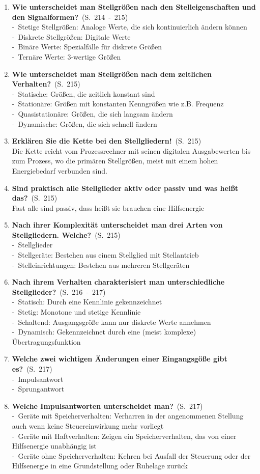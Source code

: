 \documentclass[a4paper,12pt]{article}
\newcommand{\question}[3]{\pagebreak[3]\item {\textbf{#1?}}\ (S.\ #2)#3}
\newcommand{\statement}[3]{\pagebreak[3]\item {\textbf{#1!}}\ (S.\ #2)#3}
\newcommand{\catchword}[1]{\\-\ #1}
\newcommand{\normaltext}[1]{\\#1}
\newcommand{\page}[1]{#1}
\newcommand{\pages}[2]{#1\ -\ #2}
\begin{document}
\begin{enumerate}
  \question{Wie unterscheidet man Stellgrößen nach den Stelleigenschaften
            und den Signalformen}{\pages{214}{215}}
  {
    \catchword{Stetige Stellgrößen: Analoge Werte, die sich kontinuierlich ändern können}
    \catchword{Diskrete Stellgrößen: Digitale Werte}
    \catchword{Binäre Werte: Spezialfälle für diskrete Größen}
    \catchword{Ternäre Werte: 3-wertige Größen}
  }

  \question{Wie unterscheidet man Stellgrößen nach dem zeitlichen Verhalten}{\page{215}}
  {
    \catchword{Statische: Größen, die zeitlich konstant sind}
    \catchword{Stationäre: Größen mit konstanten Kenngrößen wie z.B. Frequenz}
    \catchword{Quasistationäre: Größen, die sich langsam ändern}
    \catchword{Dynamische: Größen, die sich schnell ändern}
  }

  \statement{Erklären Sie die Kette bei den Stellgliedern}{\page{215}}
  {
    \normaltext{Die Kette reicht vom Prozessrechner mit seinen digitalen Ausgabewerten
                bis zum Prozess, wo die primären Stellgrößen, meist mit einem hohen
                Energiebedarf verbunden sind.}
  }

  \question{Sind praktisch alle Stellglieder aktiv oder passiv und was heißt das}{\page{215}}
  {
    \normaltext{Fast alle sind passiv, dass heißt sie brauchen eine Hilfsenergie}
  }

  \question{Nach ihrer Komplexität unterscheidet man drei Arten von Stellgliedern. Welche}{\page{215}}
  {
    \catchword{Stellglieder}
    \catchword{Stellgeräte: Bestehen aus einem Stellglied mit Stellantrieb}
    \catchword{Stelleinrichtungen: Bestehen aus mehreren Stellgeräten}
  }

  \question{Nach ihrem Verhalten charakterisiert man unterschiedliche Stellglieder}{\pages{216}{217}}
  {
    \catchword{Statisch: Durch eine Kennlinie gekennzeichnet}
    \catchword{Stetig: Monotone und stetige Kennlinie}
    \catchword{Schaltend: Ausgangsgröße kann nur diskrete Werte annehmen}
    \catchword{Dynamisch: Gekennzeichnet durch eine (meist komplexe) Übertragungsfunktion}
  }

  \question{Welche zwei wichtigen Änderungen einer Eingangsgöße gibt es}{\page{217}}
  {
    \catchword{Impulsantwort}
    \catchword{Sprungantwort}
  }

  \question{Welche Impulsantworten unterscheidet man}{\page{217}}
  {
    \catchword{Geräte mit Speicherverhalten: Verharren in der angenommenen Stellung
               auch wenn keine Steuereinwirkung mehr vorliegt}
    \catchword{Geräte mit Haftverhalten: Zeigen ein Speicherverhalten, das von einer
               Hilfsenergie unabhängig ist}
    \catchword{Geräte ohne Speicherverhalten: Kehren bei Ausfall der Steuerung oder der
               Hilfsenergie in eine Grundstellung oder Ruhelage zurück}
  }


\end{enumerate}
\end{document}
